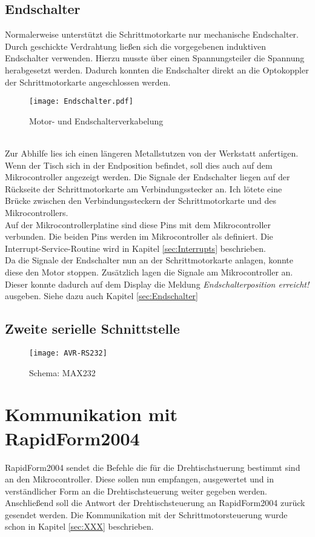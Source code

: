 \subsection{Endschalter}
Normalerweise unterstützt die Schrittmotorkarte nur mechanische Endschalter. Durch geschickte Verdrahtung ließen sich die vorgegebenen induktiven Endschalter verwenden. Hierzu musste über einen Spannungsteiler die Spannung herabgesetzt werden. Dadurch konnten die Endschalter direkt an die Optokoppler der Schrittmotorkarte angeschlossen werden. 
\begin{figure}[h]
\centering
\texttt{[image: Endschalter.pdf]}
\caption{Motor- und Endschalterverkabelung}
\label{fig:Motorverkabelung}
\end{figure}\\
Zur Abhilfe lies ich einen längeren Metallstutzen von der Werkstatt anfertigen.\\
Wenn der Tisch sich in der Endposition befindet, soll dies auch auf dem Mikrocontroller angezeigt werden. Die Signale der Endschalter liegen auf der Rückseite der Schrittmotorkarte  am Verbindungsstecker an. Ich lötete eine Brücke zwischen den Verbindungssteckern der Schrittmotorkarte und des Mikrocontrollers.\\
Auf der Mikrocontrollerplatine sind diese Pins mit dem Mikrocontroller verbunden. Die beiden Pins werden im Mikrocontroller als  definiert. Die Interrupt-Service-Routine wird in Kapitel \ref{sec:Interrupts} beschrieben.\\
Da die Signale der Endschalter nun an der Schrittmotorkarte anlagen, konnte diese den Motor stoppen. Zusätzlich lagen die Signale am Mikrocontroller an. Dieser konnte dadurch auf dem Display die Meldung \emph{Endschalterposition erreicht!} ausgeben. Siehe dazu auch Kapitel \ref{sec:Endschalter}

\subsection{Zweite serielle Schnittstelle}
\begin{figure}[htb]
\centering
\texttt{[image: AVR-RS232]}
\caption{Schema: MAX232}
\label{fig:MAX232}
\citep{uC:RS232}
\end{figure}

\section{Kommunikation mit RapidForm2004}
RapidForm2004 sendet die Befehle die für die Drehtischstuerung bestimmt sind an den Mikrocontroller.
Diese sollen nun empfangen, ausgewertet und in verständlicher Form an die Drehtischsteuerung weiter gegeben werden. 
Anschließend soll die Antwort der Drehtischsteuerung an RapidForm2004 zurück gesendet werden. Die Kommunikation mit der Schrittmotorsteuerung wurde schon in Kapitel \ref{sec:XXX} beschrieben. 
